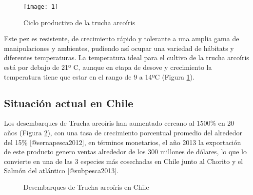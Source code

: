 \begin{figure}[h!]
	\centering
	\texttt{[image: 1]} 
	\caption {Ciclo productivo de la trucha arcoíris}
	\label {fig:ciclo}
\end{figure}

Este pez es resistente, de crecimiento rápido y tolerante a una amplia gama de manipulaciones y ambientes, pudiendo así ocupar una variedad de hábitats y diferentes temperaturas. La temperatura ideal para el cultivo de la trucha arcoíris está por debajo de 21º C, aunque en etapa de desove y crecimiento la temperatura tiene que estar en el rango de 9 a 14ºC (Figura \ref{fig:ciclo}).

\subsection{Situación actual en Chile}

Los desembarques de Trucha arcoíris han aumentado cercano al 1500\% en 20 años (Figura \ref{desembarques}), con una tasa de crecimiento porcentual promedio del alrededor del 15\% [@sernapesca2012], en términos monetarios, el año 2013 la exportación de este producto genero ventas alrededor de los 300 millones de dólares, lo que lo convierte en una de las 3 especies más cosechadas en Chile junto al Chorito y el Salmón del atlántico [@subpesca2013].

\begin{figure}[h]
\caption{Desembarques de Trucha arcoíris en Chile} \label{desembarques}
\end{figure}

